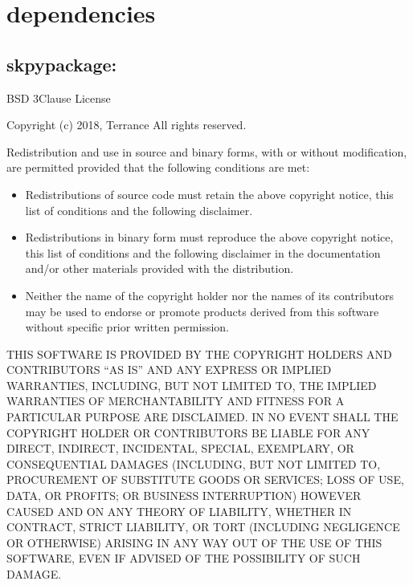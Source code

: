 \documentclass[letterpaper,10pt,english]{sphinxmanual}
\begin{document}
\section{dependencies}
\label{\detokenize{license_dependencies:dependencies}}\label{\detokenize{license_dependencies::doc}}

\subsection{skpy\sphinxhyphen{}package:}
\label{\detokenize{data/Dependecies_Licenses:skpy-package}}\label{\detokenize{data/Dependecies_Licenses::doc}}
BSD 3\sphinxhyphen{}Clause License

Copyright (c) 2018, Terrance
All rights reserved.

Redistribution and use in source and binary forms, with or without
modification, are permitted provided that the following conditions are met:
\begin{itemize}
\item {} 
Redistributions of source code must retain the above copyright notice, this
list of conditions and the following disclaimer.

\item {} 
Redistributions in binary form must reproduce the above copyright notice,
this list of conditions and the following disclaimer in the documentation
and/or other materials provided with the distribution.

\item {} 
Neither the name of the copyright holder nor the names of its
contributors may be used to endorse or promote products derived from
this software without specific prior written permission.

\end{itemize}

THIS SOFTWARE IS PROVIDED BY THE COPYRIGHT HOLDERS AND CONTRIBUTORS “AS IS”
AND ANY EXPRESS OR IMPLIED WARRANTIES, INCLUDING, BUT NOT LIMITED TO, THE
IMPLIED WARRANTIES OF MERCHANTABILITY AND FITNESS FOR A PARTICULAR PURPOSE ARE
DISCLAIMED. IN NO EVENT SHALL THE COPYRIGHT HOLDER OR CONTRIBUTORS BE LIABLE
FOR ANY DIRECT, INDIRECT, INCIDENTAL, SPECIAL, EXEMPLARY, OR CONSEQUENTIAL
DAMAGES (INCLUDING, BUT NOT LIMITED TO, PROCUREMENT OF SUBSTITUTE GOODS OR
SERVICES; LOSS OF USE, DATA, OR PROFITS; OR BUSINESS INTERRUPTION) HOWEVER
CAUSED AND ON ANY THEORY OF LIABILITY, WHETHER IN CONTRACT, STRICT LIABILITY,
OR TORT (INCLUDING NEGLIGENCE OR OTHERWISE) ARISING IN ANY WAY OUT OF THE USE
OF THIS SOFTWARE, EVEN IF ADVISED OF THE POSSIBILITY OF SUCH DAMAGE.
\end{document}
